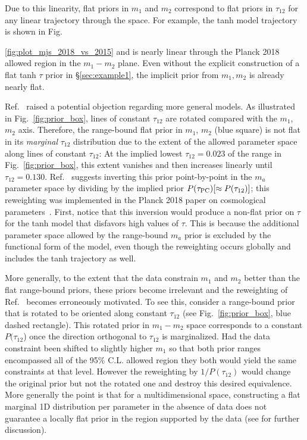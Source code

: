 \documentclass[aps,prd,twocolumn,amsmath,amssymb,showpacs,floatfix,superscriptaddress,nofootinbib]{revtex4-1}
\begin{document}
Due to this linearity, flat priors in $m_1$ and $m_2$ correspond to
flat priors in $\tau_{12}$ for any linear trajectory through the space.   For example, the tanh model trajectory is shown in Fig.~{\ref{fig:plot_mjs_2018_vs_2015} and is nearly linear through the Planck 2018 allowed region in the $m_1-m_2$ plane.  Even without the explicit 
construction of a flat tanh $\tau$ prior in \S \ref{sec:example1}, 
the implicit prior from $m_1,m_2$ is already nearly flat. 

Ref.~\cite{Millea:2018bko} raised a potential objection regarding more general models.  As illustrated in Fig.~\ref{fig:prior_box}, lines of constant $\tau_{12}$ are rotated compared with the $m_1$,
$m_2$ axis.  Therefore, the range-bound flat prior in $m_1$, $m_2$ (blue square)  is not flat in its {\it marginal} $\tau_{12}$  distribution due to the extent  of the allowed parameter space along lines of constant $\tau_{12}$: At 
the implied lowest $\tau_{12}=0.023$ of the range
in Fig.~\ref{fig:prior_box},
this extent vanishes and then increases linearly until $\tau_{12} = 0.130$.
 Ref.~\cite{Millea:2018bko} suggests 
inverting this prior point-by-point in the $m_a$ parameter space by dividing by the implied prior $P(\tau_{\rm PC}) [ \approx P(\tau_{12})]$; this reweighting was implemented in the Planck 2018 paper on cosmological parameters~\cite{Aghanim:2018eyx}.
First, notice that this inversion would 
produce a non-flat prior on $\tau$ for the tanh model
that disfavors high values of $\tau$.   This is because
the additional parameter space allowed by the range-bound $m_a$ prior is excluded by the functional form of the model, even though the reweighting occurs globally and includes the tanh trajectory as well. 

More generally, to the extent that the data constrain $m_1$ and $m_2$ better than the flat range-bound priors, these priors become irrelevant and the reweighting of Ref.~\cite{Millea:2018bko} becomes erroneously motivated.   To see this, consider a range-bound prior that is rotated to be oriented along constant $\tau_{12}$ (see Fig.~\ref{fig:prior_box}, blue dashed rectangle). This rotated prior in $m_1-m_2$ space corresponds to a constant $P(\tau_{12}$) once the direction orthogonal to $\tau_{12}$ is marginalized.
Had the data constraint been shifted to slightly higher
$m_1$ so that both prior ranges encompassed all of the 95\% C.L. allowed
region they both would yield  the same constraints at that level.
However the reweighting by $1/P(\tau_{12})$ would change the original prior but not the rotated one and destroy this desired equivalence. 
More generally the point is that for a multidimensional space, constructing a flat marginal 1D distribution per parameter in the absence of data does not guarantee a locally flat prior in the region supported by the data
(see \cite{Heinrich:2018btc} for further discussion).

}
\end{document}
